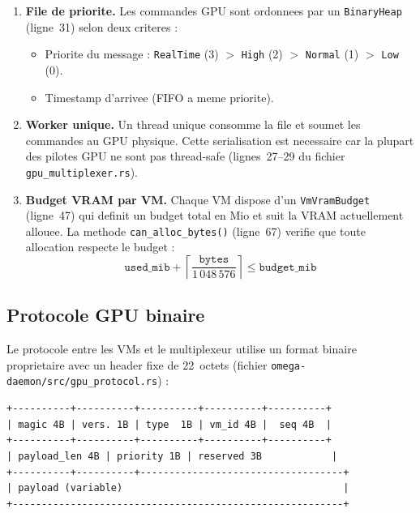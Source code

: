 \begin{enumerate}
    \item \textbf{File de priorite.} Les commandes GPU sont ordonnees par un \texttt{BinaryHeap} (ligne~31) selon deux criteres :
    \begin{itemize}
        \item Priorite du message : \texttt{RealTime} (3) $>$ \texttt{High} (2) $>$ \texttt{Normal} (1) $>$ \texttt{Low} (0).
        \item Timestamp d'arrivee (FIFO a meme priorite).
    \end{itemize}

    \item \textbf{Worker unique.} Un thread unique consomme la file et soumet les commandes au GPU physique. Cette serialisation est necessaire car la plupart des pilotes GPU ne sont pas thread-safe (lignes~27--29 du fichier \texttt{gpu\_multiplexer.rs}).

    \item \textbf{Budget VRAM par VM.} Chaque VM dispose d'un \texttt{VmVramBudget} (ligne~47) qui definit un budget total en Mio et suit la VRAM actuellement allouee. La methode \texttt{can\_alloc\_bytes()} (ligne~67) verifie que toute allocation respecte le budget :
    \begin{equation}
        \texttt{used\_mib} + \left\lceil\frac{\texttt{bytes}}{1\,048\,576}\right\rceil \leq \texttt{budget\_mib}
    \end{equation}
\end{enumerate}

\subsection{Protocole GPU binaire}
\label{subsec:protocole-gpu}

Le protocole entre les VMs et le multiplexeur utilise un format binaire proprietaire avec un header fixe de 22~octets (fichier \texttt{omega-daemon/src/gpu\_protocol.rs}) :

\begin{verbatim}
+----------+----------+----------+----------+----------+
| magic 4B | vers. 1B | type  1B | vm_id 4B |  seq 4B  |
+----------+----------+----------+----------+----------+
| payload_len 4B | priority 1B | reserved 3B            |
+----------+----------+-----------------------------------+
| payload (variable)                                      |
+---------------------------------------------------------+
\end{verbatim}

